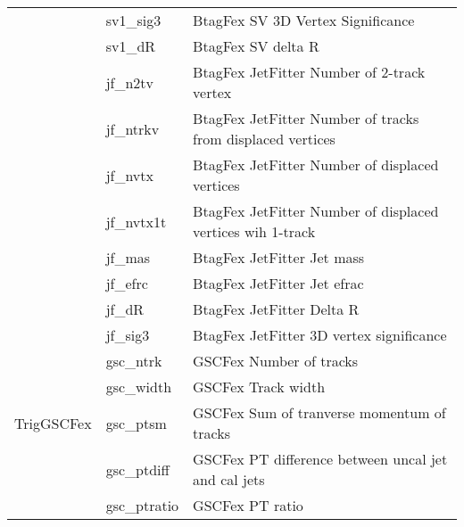 {\begin{center}
{\begin{tabular}{ |l|l|l| }
                         &   sv1\_sig3     &  BtagFex SV 3D Vertex Significance \\
                         &   sv1\_dR       &  BtagFex SV delta R \\
                         &   jf\_n2tv      &  BtagFex JetFitter Number of 2-track vertex \\
                         &   jf\_ntrkv     &  BtagFex JetFitter Number of tracks from displaced vertices \\
                         &   jf\_nvtx      &  BtagFex JetFitter Number of displaced vertices \\
                         &   jf\_nvtx1t    &  BtagFex JetFitter Number of displaced vertices wih 1-track \\
                         &   jf\_mas       &  BtagFex JetFitter Jet mass \\
                         &   jf\_efrc      &  BtagFex JetFitter Jet efrac \\
                         &   jf\_dR        &  BtagFex JetFitter Delta R \\
                         &   jf\_sig3      &  BtagFex JetFitter 3D vertex significance \\
             \hline
                         &   gsc\_ntrk     &  GSCFex Number of tracks \\
                         &   gsc\_width    &  GSCFex Track width \\
     TrigGSCFex          &   gsc\_ptsm     &  GSCFex Sum of tranverse momentum of tracks \\
                         &   gsc\_ptdiff   &  GSCFex PT difference between uncal jet and cal jets \\
                         &   gsc\_ptratio  &  GSCFex PT ratio \\
            \hline
    \end{tabular}
    } \end{center}
}
